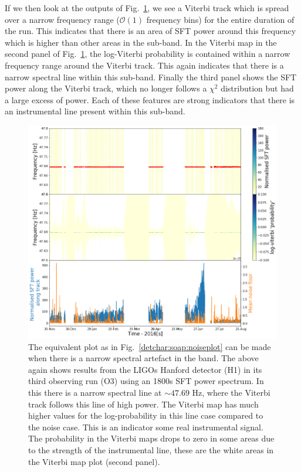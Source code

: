If we then look at the outputs of Fig.~\ref{detchar:soap:lineplot}, we see a Viterbi track which is spread over a narrow frequency range ($\mathcal{O}(1)$ frequency bins) for the entire duration of the run.  
This indicates that there is an area of \gls{SFT} power around this frequency which is higher than other areas in the sub-band.
In the Viterbi map in the second panel of Fig.~\ref{detchar:soap:lineplot}, the log-Viterbi probability is contained within a narrow frequency range around the Viterbi track.
This again indicates that there is a narrow spectral line within this sub-band.
Finally the third panel shows the \gls{SFT} power along the Viterbi track, which no longer follows a $\chi^2$ distribution but had a large excess of power.
Each of these features are strong indicators that there is an instrumental line
present within this sub-band.~
%
\begin{figure}[hpt]
	\centering
	\includegraphics[width=\textwidth]{C6_detchar/track_F47_6_47_8_linenarrow.png}
	\caption[Example SOAP output for string narrow instrumental line.]{The
equivalent plot as in Fig.~\ref{detchar:soap:noiseplot} can be made when there
is a narrow spectral artefact in the band. The above again shows results from
the \glspl{LIGO} Hanford detector (H1) in its third observing run (O3) using
an 1800s \gls{SFT} power spectrum. In this there is a narrow spectral line at
$\sim 47.69$ Hz, where the Viterbi track follows this line of high power. The
Viterbi map has much higher values for the log-probability in this line case
compared to the noise case. This is an indicator some
real instrumental signal. The
probability in the Viterbi maps drops to zero in some areas due to the strength
of the instrumental line, these are the white areas in the Viterbi map plot
(second panel). } \label{detchar:soap:lineplot}

\end{figure}
%


